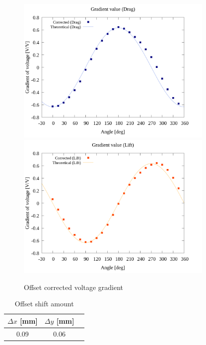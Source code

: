 \begin{figure}[htbp]
  \begin{center}
    \includegraphics[width=95mm]{../../02_workspace/result/2-ex/plot/21/21-2_corrected_offset_drag.png}
    \includegraphics[width=95mm]{../../02_workspace/result/2-ex/plot/21/21-2_corrected_offset_lift.png}
  \end{center}
  \caption{Offset corrected voltage gradient}
\end{figure}

\begin{table}[htbp]
  \begin{center}
    \caption{Offset shift amount}
    \begin{tabular}{|p{30mm}|p{20mm}|p{20mm}|}
      \hline
      \multicolumn{1}{|c|}{$\Delta x$ [mm]} & \multicolumn{1}{|c|}{$\Delta y$ [mm]} \\ \hline
      \multicolumn{1}{|c|}{0.09}            & \multicolumn{1}{|c|}{0.06}            \\ \hline
    \end{tabular}
  \end{center}
\end{table}

